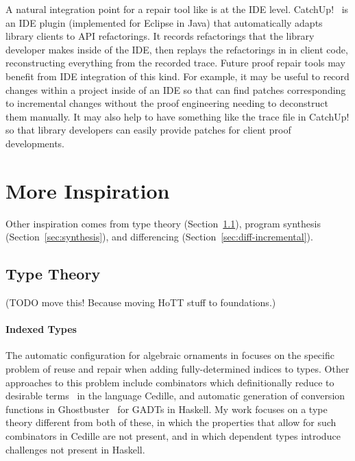 A natural integration point for a repair tool like \sysnamelong is at the IDE level. 
CatchUp!~\cite{Henkel:2005:CCR:1062455.1062512} is an IDE plugin (implemented for Eclipse in Java) that automatically adapts library clients to API refactorings.
It records refactorings that the library developer makes inside of the IDE,
then replays the refactorings in in client code, reconstructing everything from the recorded trace.
Future proof repair tools may benefit from IDE integration of this kind.
For example, it may be useful to record changes within a project inside of an IDE 
so that \sysnamelong can find patches corresponding to incremental changes without the proof engineering needing to deconstruct them manually.
It may also help to have something like the trace file in CatchUp! so that library developers can easily provide patches for client proof developments.

\iffalse
\section{More Inspiration}
\label{sec:inspiration}

Other inspiration comes from type theory (Section~\ref{sec:typetheory}),
program synthesis (Section~\ref{sec:synthesis}),
and differencing (Section~\ref{sec:diff-incremental}).


\subsection{Type Theory}
\label{sec:typetheory}

(TODO move this! Because moving HoTT stuff to foundations.)

\paragraph{Indexed Types}
The automatic configuration for algebraic ornaments in \toolnamec focuses on the specific problem of reuse and repair when adding fully-determined indices to types.
Other approaches to this problem include combinators which definitionally reduce to desirable terms~\cite{DBLP:journals/corr/abs-1803-08150} in the language Cedille,
and automatic generation of conversion functions in Ghostbuster~\cite{McDonell:2016:GTS:2951913.2951914} for GADTs in Haskell.
My work focuses on a type theory different from both of these, in which the properties that allow for such combinators in Cedille are not present, and in which dependent types introduce challenges not present in Haskell.

